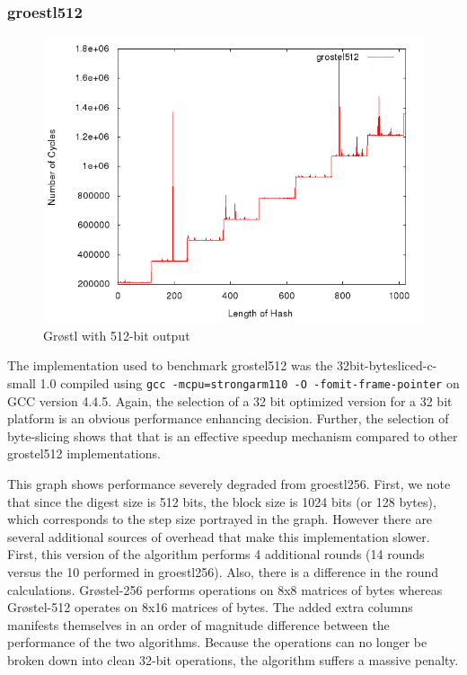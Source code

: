 \documentclass[10pt,a4paper]{article}
\begin{document}
\subsubsection{groestl512}
    \begin{figure}[H]
        \begin{center}
            \includegraphics[scale=0.5]{images/grostel512.png} 
            \caption{Gr{\o}stl with 512-bit output}
        \end{center}
    \end{figure}

The implementation used to benchmark grostel512 was the 32bit-bytesliced-c-small
1.0 compiled using \texttt{gcc -mcpu=strongarm110 -O -fomit-frame-pointer} on
GCC version 4.4.5. Again, the selection of a 32 bit optimized version for a 32
bit platform is an obvious performance enhancing decision. Further, the
selection of byte-slicing shows that that is an effective speedup mechanism
compared to other grostel512 implementations.

This graph shows performance severely degraded from groestl256.  First, we note that since the digest size is 512 bits, the block size is 1024 bits (or 128 bytes), which corresponds to the step size portrayed in the graph.  However there are several additional sources of overhead that make this implementation slower.  First, this version of the algorithm performs 4 additional rounds (14 rounds versus the 10 performed in groestl256).  Also, there is a difference in the round calculations.  Gr{\o}stel-256 performs operations on 8x8 matrices of bytes whereas Gr{\o}stel-512 operates on 8x16 matrices of bytes.  The added extra columns manifests themselves in an order of magnitude difference between the performance of the two algorithms.  Because the operations can no longer be broken down into clean 32-bit operations, the algorithm suffers a massive penalty.
\end{document}
